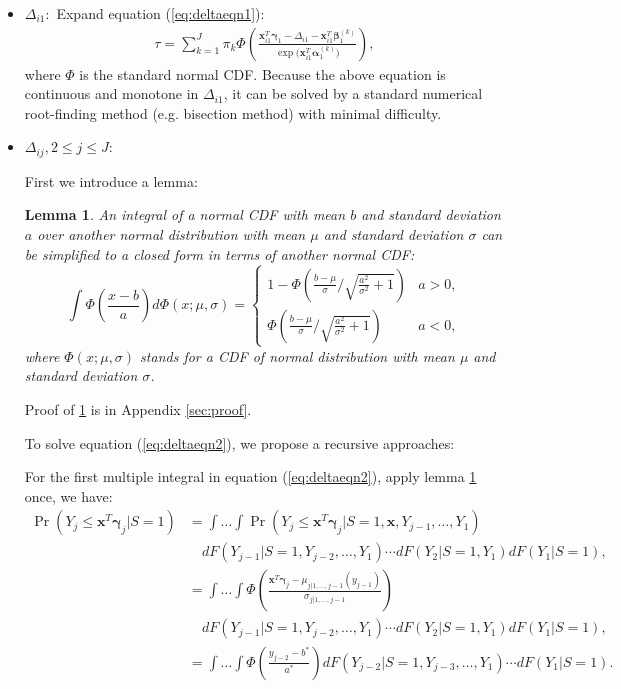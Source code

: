 \documentclass[12pt]{article}
\newtheorem{lem}[thm]{Lemma}
\DeclareMathOperator{\prob}{Pr}
\begin{document}
\begin{itemize}
\item \textbf{$\Delta_{i1}: $} Expand equation (\ref{eq:deltaeqn1}):
  \begin{align*}
    \tau = \sum_{k = 1}^J \pi_k \Phi \left( \frac{\bm x_{i1}^T \bm
        \gamma_1 - \Delta_{i1} - \bm x_{i1}^T\bm \beta_1^{(k)}}{\exp
        \big( \bm x_{i1}^T \bm \alpha_1^{(k)} \big)} \right),
  \end{align*}
  where $\Phi$ is the standard normal CDF. Because the above equation
  is continuous and monotone in $\Delta_{i1}$, it can be solved by a
  standard numerical root-finding method (e.g. bisection method) with
  minimal difficulty.

\item \textbf{$\Delta_{ij}, 2\leq j \leq J: $}

  First we introduce a lemma:
  \begin{lem}\label{sec:lemma}
    An integral of a normal CDF with mean $b$ and standard deviation
    $a$ over another normal distribution with mean $\mu$ and standard
    deviation $\sigma$ can be simplified to a closed form in terms of
    another normal CDF:
    \begin{equation}
      \label{eq:lem}
      \int \Phi \left( \frac{x-b}{a} \right) d\Phi(x; \mu, \sigma)  =
      \begin{cases}
        1- \Phi \left( \frac{b-\mu}{\sigma} \big / \sqrt{\frac{a^2}{\sigma^2}+1} \right) & a > 0, \\
        \Phi \left( \frac{b-\mu}{\sigma} \big /
          \sqrt{\frac{a^2}{\sigma^2}+1} \right) & a < 0 ,
      \end{cases}
    \end{equation}
    where $\Phi(x; \mu, \sigma)$ stands for a CDF of normal
    distribution with mean $\mu$ and standard deviation $\sigma$.
  \end{lem}
  Proof of \ref{sec:lemma} is in Appendix \ref{sec:proof}.

  To solve equation (\ref{eq:deltaeqn2}), we propose a recursive
  approaches:

  For the first multiple integral in equation (\ref{eq:deltaeqn2}), apply
lemma \ref{sec:lemma} once, we have:
  \begin{align*}
    \prob (Y_j \leq \bm x^T \bm \gamma_j | S = 1) & = \int\dots\int
    \prob (Y_j \leq \bm x^T\bm \gamma_j | S=1, \bm x, Y_{j-1}, \ldots, Y_1)\\
    & \quad  dF(Y_{j-1}|S=1, Y_{j-2}, \ldots, Y_1) \cdots dF(Y_2|S=1, Y_1) d F (Y_1 | S = 1), \\
& = \int\dots\int
    \Phi \left( \frac{\bm x^T \bm \gamma_j - \mu_{j|1, \ldots, j-1}(y_{j-1})}{\sigma_{j|1, \ldots, j-1}} \right) \\
& \quad dF(Y_{j-1}|S=1, Y_{j-2}, \ldots, Y_1) \cdots dF(Y_2|S=1, Y_1) d F (Y_1 | S = 1), \\
    & = \int\dots\int
    \Phi \left( \frac{y_{j-2} - b^{*}}{a^{*}} \right)
dF(Y_{j-2}|S=1, Y_{j-3}, \ldots, Y_1) \cdots d F (Y_1 | S = 1).
  \end{align*}


\end{itemize}
\end{document}
